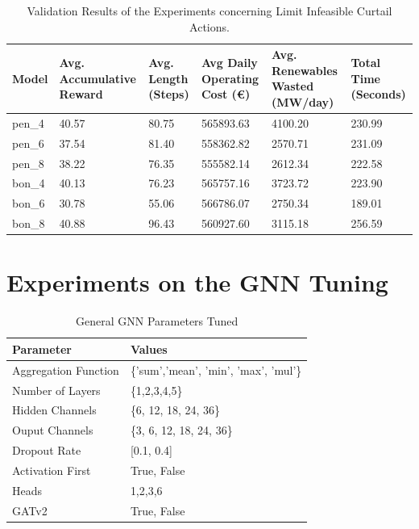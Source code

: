 \begin{table}[ht]
	\centering
	\begin{tabularx}{\textwidth}{|l|X|X|X|X|X|}
		\hline
		\textbf{Model} & \textbf{Avg. Accumulative Reward}& \textbf{Avg. Length (Steps)} & \textbf{Avg Daily Operating Cost (€)} & \textbf{Avg. Renewables Wasted (MW/day)} & \textbf{Total Time (Seconds)}\\
		\hline
		pen\_4 & 40.57 & 80.75 & 565893.63 & 4100.20 & 230.99 \\
		pen\_6 & 37.54 & 81.40 & 558362.82 & 2570.71 & 231.09 \\
		pen\_8 & 38.22 & 76.35 & 555582.14 & 2612.34 & 222.58 \\
		bon\_4 & 40.13 & 76.23 & 565757.16 & 3723.72 & 223.90 \\
		bon\_6 & 30.78 & 55.06 & 566786.07 & 2750.34 & 189.01 \\
		bon\_8 & 40.88 & 96.43 & 560927.60 & 3115.18 & 256.59 \\
		\hline
	\end{tabularx}
	\caption{Validation Results of the Experiments concerning Limit Infeasible Curtail Actions.}
	\label{fig:curtail-val}
\end{table}

\section{Experiments on the \ac{GNN} Tuning}

\begin{table}
	\begin{tabular}{|l|l|}
		\hline
		\textbf{Parameter} & \textbf{Values} \\
		\hline
		Aggregation Function & \{'sum','mean', 'min', 'max', 'mul'\} \\
		\hline
		Number of Layers & \{1,2,3,4,5\} \\
		\hline
		Hidden Channels & \{6, 12, 18, 24, 36\} \\
		\hline
		Ouput Channels & \{3, 6, 12, 18, 24, 36\} \\
		\hline 
		Dropout Rate & [0.1, 0.4] \\
		\hline
		Activation First & {True, False} \\
		\hline 
		Heads & {1,2,3,6} \\
		\hline
		GATv2 & {True, False} \\
		\hline
	\end{tabular}
	\caption{General \ac{GNN} Parameters Tuned}
\end{table}

